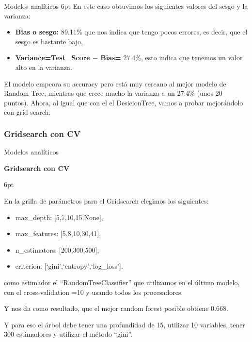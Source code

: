 \documentclass[pdf]{beamer}
\def\vspace{}%
\begin{document}
{\begin{frame}{Modelos analíticos}
\vspace{6pt}    
    En este caso  obtuvimos los siguientes valores del sesgo y la varianza:
    \begin{itemize}
        \item \textbf{Bias o sesgo:} 89.11\% que nos indica que tengo pocos errores, es decir, que el sesgo es bastante bajo,
        \item \textbf{Variance=Test\_Score $-$ Bias=} 27.4\%, esto indica que tenemos un valor alto en la varianza.
        \end{itemize}

    El modelo empeora su accuracy pero está muy cercano al mejor modelo de Random Tree, mientras que crece mucho la varianza a un 27.4\% (unos 20 puntos). Ahora, al igual que con el el DesicionTree, vamos a probar mejorándolo con grid search.

\end{frame}

    \subsubsection{Gridsearch con CV}

\begin{frame}{Modelos analíticos}

    \begin{Large}
        \textbf{Gridsearch con CV}
    \end{Large}
    \vspace{6pt}

    En la grilla de parámetros para el Gridsearch elegimos los siguientes:
    \begin{itemize}
        \item max\_depth: [5,7,10,15,None],
        \item max\_features: [5,8,10,30,41],
        \item n\_estimators: [200,300,500],
        \item criterion: [`gini',`entropy',`log\_loss'].
    \end{itemize}
    como estimador el ``RandomTreeClassifier'' que utilizamos en el último modelo, con el cross-validation =10 y  usando todos los procesadores.

    Y nos da como resultado, que el mejor random forest posible obtiene 0.668. 

    Y para eso el árbol debe tener una profundidad de 15, utilizar  10  variables, tener  300  estimadores y utilizar el método ``gini''.


\end{frame}}
\end{document}
